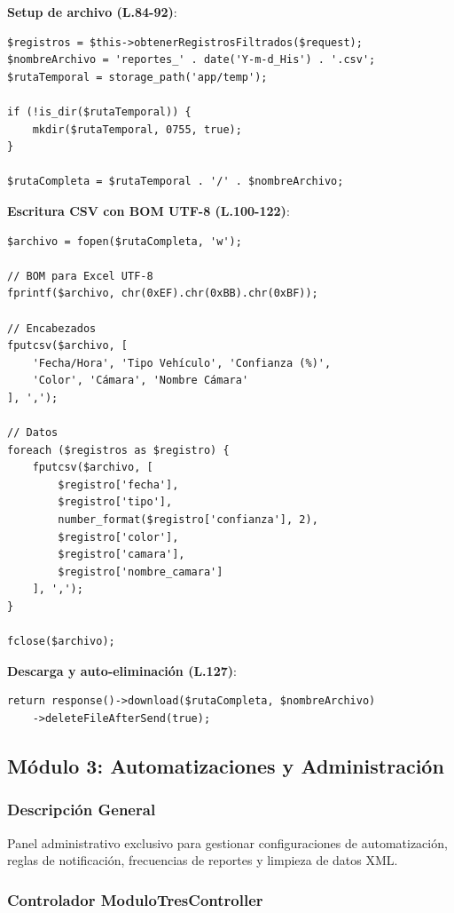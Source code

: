 \textbf{Setup de archivo (L.84-92)}:
\begin{lstlisting}[style=phpstyle]
$registros = $this->obtenerRegistrosFiltrados($request);
$nombreArchivo = 'reportes_' . date('Y-m-d_His') . '.csv';
$rutaTemporal = storage_path('app/temp');

if (!is_dir($rutaTemporal)) {
    mkdir($rutaTemporal, 0755, true);
}

$rutaCompleta = $rutaTemporal . '/' . $nombreArchivo;
\end{lstlisting}

\textbf{Escritura CSV con BOM UTF-8 (L.100-122)}:
\begin{lstlisting}[style=phpstyle]
$archivo = fopen($rutaCompleta, 'w');

// BOM para Excel UTF-8
fprintf($archivo, chr(0xEF).chr(0xBB).chr(0xBF));

// Encabezados
fputcsv($archivo, [
    'Fecha/Hora', 'Tipo Vehículo', 'Confianza (%)', 
    'Color', 'Cámara', 'Nombre Cámara'
], ',');

// Datos
foreach ($registros as $registro) {
    fputcsv($archivo, [
        $registro['fecha'],
        $registro['tipo'],
        number_format($registro['confianza'], 2),
        $registro['color'],
        $registro['camara'],
        $registro['nombre_camara']
    ], ',');
}

fclose($archivo);
\end{lstlisting}

\textbf{Descarga y auto-eliminación (L.127)}:
\begin{lstlisting}[style=phpstyle]
return response()->download($rutaCompleta, $nombreArchivo)
    ->deleteFileAfterSend(true);
\end{lstlisting}

\newpage
\subsection{Módulo 3: Automatizaciones y Administración}

\subsubsection{Descripción General}

Panel administrativo exclusivo para gestionar configuraciones de automatización, reglas de notificación, frecuencias de reportes y limpieza de datos XML.

\subsubsection{Controlador ModuloTresController}

